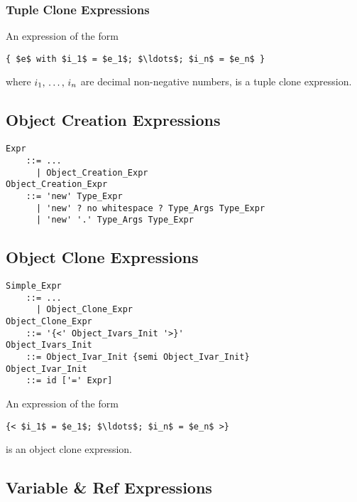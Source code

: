 \subsubsection{Tuple Clone Expressions}
\label{sec:tuple-clone}

An expression of the form 
\begin{lstlisting}
{ $e$ with $i_1$ = $e_1$; $\ldots$; $i_n$ = $e_n$ }
\end{lstlisting}
where $i_1 ,\, \ldots ,\, i_n$ are decimal non-negative numbers, is a tuple clone expression. 






\subsection{Object Creation Expressions}
\label{sec:object-creation-exprs}

\grammar\begin{lstlisting}[deletekeywords={no}]
Expr
    ::= ...
      | Object_Creation_Expr
Object_Creation_Expr 
    ::= 'new' Type_Expr 
      | 'new' ? no whitespace ? Type_Args Type_Expr 
      | 'new' '.' Type_Args Type_Expr 
\end{lstlisting}







\subsection{Object Clone Expressions}
\label{sec:object-clone-expressions}

\grammar\begin{lstlisting}
Simple_Expr 
    ::= ...
      | Object_Clone_Expr
Object_Clone_Expr 
    ::= '{<' Object_Ivars_Init '>}'
Object_Ivars_Init 
    ::= Object_Ivar_Init {semi Object_Ivar_Init}
Object_Ivar_Init
    ::= id ['=' Expr]
\end{lstlisting}

An expression of the form
\begin{lstlisting}
{< $i_1$ = $e_1$; $\ldots$; $i_n$ = $e_n$ >}
\end{lstlisting}
is an object clone expression. 





\subsection[Variable \& Ref Expressions]{Variable \& Ref Expressions}
\label{sec:ref-expressions}
\label{sec:var-expressions}

